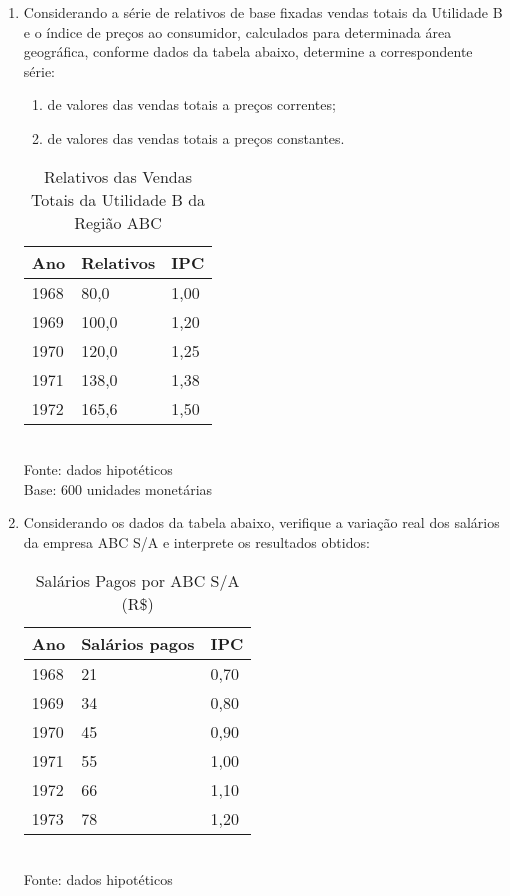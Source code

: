 \begin{enumerate}[resume]
\item Considerando a série de relativos de base fixadas vendas totais da Utilidade B e o índice de preços ao consumidor, calculados para determinada área geográfica, conforme dados da tabela abaixo, determine a correspondente série:
	\begin{enumerate}
	\item de valores das vendas totais a preços correntes;
	\item de valores das vendas totais a preços constantes.
	\end{enumerate}
	\begin{table}[!htb]
	\centering
	\caption{Relativos das Vendas Totais da Utilidade B da Região ABC}
	\vspace{0.5cm}
	\begin{tabular}{lll}
	Ano & Relativos & IPC \\
	\hline 
	1968 & 80,0 & 1,00  \\
	1969 & 100,0 & 1,20  \\
	1970 & 120,0 & 1,25  \\
	1971 & 138,0 & 1,38  \\
	1972 & 165,6 & 1,50  \\
	\end{tabular}\\
	Fonte: dados hipotéticos\\
	Base: 600 unidades monetárias
	\end{table}	
	
\item Considerando os dados da tabela abaixo, verifique a variação real dos salários da empresa ABC S/A e interprete os resultados obtidos:
	\begin{table}[!htb]
	\centering
	\caption{Salários Pagos por ABC S/A (R\$)}
	\vspace{0.5cm}
	\begin{tabular}{lll}
	Ano & Salários pagos & IPC \\
	\hline 
	1968 & 21 & 0,70  \\
	1969 & 34 & 0,80  \\
	1970 & 45 & 0,90  \\
	1971 & 55 & 1,00  \\
	1972 & 66 & 1,10  \\
	1973 & 78 & 1,20  \\	
	\end{tabular}\\
	Fonte: dados hipotéticos
	\end{table}		
	

\end{enumerate}
